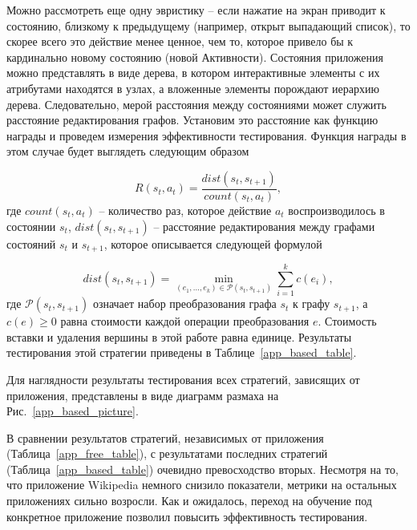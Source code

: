 Можно рассмотреть еще одну эвристику -- если нажатие на экран приводит к состоянию, близкому к предыдущему (например, открыт выпадающий список), то скорее всего это действие менее ценное, чем то, которое привело бы к кардинально новому состоянию (новой Активности). Состояния приложения можно представлять в виде дерева, в котором интерактивные элементы с их атрибутами находятся в узлах, а вложенные элементы порождают иерархию дерева. Следовательно,  мерой расстояния между состояниями может служить расстояние редактирования графов. Установим это расстояние как функцию награды и проведем измерения эффективности тестирования. Функция награды в этом случае будет выглядеть следующим образом

$$R(s_t, a_t) = \frac{dist(s_t, s_{t+1})}{count(s_t, a_t)},$$
где $count(s_t, a_t)$ -- количество раз, которое действие $a_t$ воспроизводилось в состоянии $s_t$, $dist(s_t, s_{t+1})$ -- расстояние редактирования между графами состояний $s_{t}$ и $s_{t+1}$, которое описывается следующей формулой

$$dist(s_{t},s_{t+1}) = \min_{(e_{1},...,e_{k}) \in \mathcal{P}(s_{t},s_{t+1})} \sum_{i=1}^{k} c(e_{i}) ,$$
где  $\mathcal {P}(s_{t},s_{t+1})$ означает набор преобразования графа $s_{t}$ к графу  $s_{t+1}$, а $c(e)\geqslant 0$ равна стоимости каждой операции преобразования $e$. Стоимость вставки и удаления вершины в этой работе равна единице. Результаты тестирования этой стратегии приведены в Таблице~\ref{app_based_table}.

Для наглядности результаты тестирования всех стратегий, зависящих от приложения, представлены в виде диаграмм размаха на Рис.~\ref{app_based_picture}.


В сравнении результатов стратегий, независимых от приложения (Таблица~\ref{app_free_table}), с результатами последних стратегий (Таблица~\ref{app_based_table}) очевидно превосходство вторых. Несмотря на то, что приложение Wikipedia немного снизило показатели, метрики на остальных приложениях сильно возросли. Как и ожидалось, переход на обучение под конкретное приложение позволил повысить эффективность тестирования.

